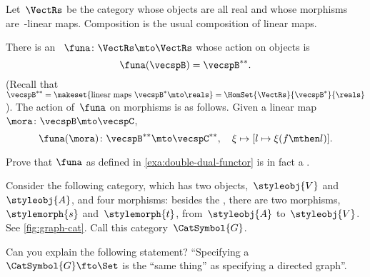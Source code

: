 \begin{solution}
\end{solution}




\begin{example}
    \label{exa:double-dual-functor}
    Let~$\VectRs$ be the category whose objects are all real  and whose morphisms are~\reals-linear maps.
    Composition is the usual composition of linear maps.

    There is an ~$\funa \colon \VectRs \mto \VectRs$ whose action on objects is
    \begin{equation}
        \funa ( \vecspB ) = \vecspB^{**}.
    \end{equation}
    (Recall that~$\vecspB^{**} = \makeset{ \text{linear maps } \vecspB^* \mto \reals } =  \HomSet{\VectRs}{\vecspB^*}{\reals}$).
    The action of~$\funa$ on morphisms is as follows.
    Given a linear map~$\mora \colon \vecspB \mto \vecspC$,
    \begin{equation}
        \funa ( \mora ) \colon \vecspB^{**} \mto \vecspC^{**}, \quad \xi \mapsto [ l \mapsto \xi (f \mthen l)].
    \end{equation}
\end{example}

\begin{gradedexercise}
    \label{ex:DoubleDualFunctor}
    Prove that $\funa$ as defined in \cref{exa:double-dual-functor} is in fact a .
\end{gradedexercise}

\begin{gradedexercise}
    \label{ex:GraphsViaFunctors}
    Consider the following category, which has two objects,~$\styleobj{V}$ and~$\styleobj{A}$, and four morphisms: besides the , there are two morphisms,~$\stylemorph{s}$ and~$\stylemorph{t}$, from~$\styleobj{A}$ to~$\styleobj{V}$.
    See \cref{fig:graph-cat}.
    Call this category~$\CatSymbol{G}$.

    Can you explain the following statement?
    ``Specifying a ~$\CatSymbol{G} \fto \Set$ is the ``same thing'' as specifying a directed graph''.
\end{gradedexercise}


\begin{marginfigure}
    \centering
    \caption{}
    \label{fig:graph-cat}
\end{marginfigure}

